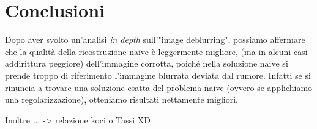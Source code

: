 \section{Conclusioni}
Dopo aver svolto un'analisi \textit{in depth} sull'"image deblurring", possiamo
 affermare che la qualità della ricostruzione naive è leggermente migliore,
 (ma in alcuni casi addirittura peggiore) dell'immagine corrotta, poiché nella
 soluzione naive si prende troppo di riferimento l'immagine blurrata deviata
 dal rumore. Infatti se si rinuncia a trovare una soluzione esatta del problema
 naive (ovvero se applichiamo una regolarizzazione),
 otteniamo risultati nettamente migliori.

 Inoltre ... -> relazione koci o Tassi XD